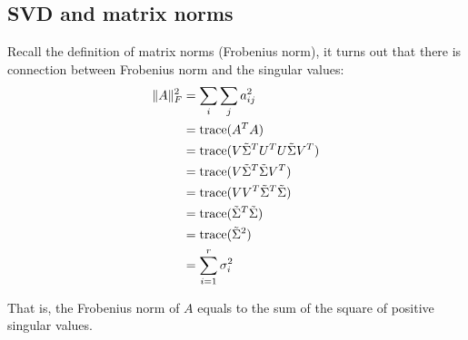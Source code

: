\subsection{SVD and matrix norms}
Recall the definition of matrix norms (Frobenius norm), it turns out that there is connection between Frobenius norm and the singular values:
\begin{align*}
\Vert A\Vert_F^2 
&=\sum_i \sum_j	a_{ij}^2\\
&=\operatorname{trace}(A^TA)\\
&=\operatorname{trace}(V\tilde{\Sigma}^T U^T U \tilde{\Sigma} V^T)\\
&=\operatorname{trace}(V \tilde{\Sigma}^T \tilde{\Sigma} V^T)\\
&=\operatorname{trace}(V V^T \tilde{\Sigma}^T \tilde{\Sigma})\\
&=\operatorname{trace}(\tilde{\Sigma}^T \tilde{\Sigma})\\
&=\operatorname{trace}(\tilde{\Sigma}^2)\\
&=\sum_{i=1}^{r} \sigma_i^2
\end{align*}

That is, the Frobenius norm of $A$ equals to the sum of the square of positive singular values.